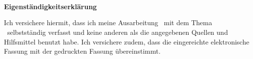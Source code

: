 \thispagestyle{empty}


\AutorVorname\ \AutorNachname\\
\AutorAnschrift\\
\AutorPLZ\ \AutorStadt\
\vspace{2cm}



\begin{center}
\huge{\textbf{Eigenständigkeitserklärung}}
\vspace{2cm}
\end{center}

Ich versichere hiermit, dass ich meine Ausarbeitung \AusarbeitungBezeichnung\ mit dem Thema \grqq \AusarbeitungThema \grqq\ selbstständig verfasst und keine anderen als die angegebenen Quellen und Hilfsmittel benutzt habe.
Ich versichere zudem, dass die eingereichte elektronische Fassung mit der gedruckten Fassung übereinstimmt.

\Unterschrift

\thispagestyle{empty}